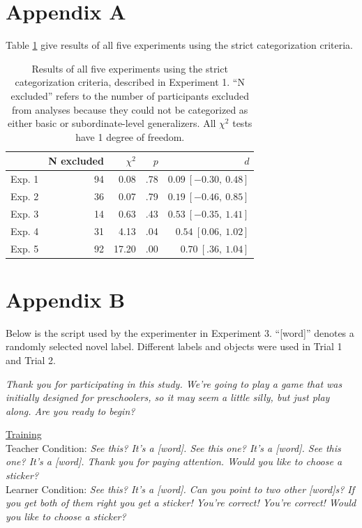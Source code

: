 \documentclass[man]{apa2}
\begin{document}
\section{Appendix A}

Table \ref{tab:strictResults} give results of all five experiments using the strict categorization criteria.

\begin{table}[h]
\centering
\begin{tabular}{rrrrr}
 \hline
 & N excluded & $\chi^2$ & $p$ & $d$ \\ 
 \hline
Exp. 1 & 94 & 0.08 & .78 & $0.09\ [-0.30,\ 0.48]$\\ 
Exp. 2 & 36 & 0.07 & .79 & $0.19\ [-0.46,\ 0.85]$ \\ 
Exp. 3 & 14 & 0.63 & .43 & $0.53\ [-0.35,\ 1.41]$ \\ 
Exp. 4 & 31 & 4.13 & .04 & $0.54\ [0.06,\ 1.02]$\\ 
Exp. 5 & 92 & 17.20 &  .00 & $0.70\ [.36,\ 1.04]$\\ 
 \hline
\end{tabular}
\caption{\label{tab:strictResults} Results of all five experiments using the strict categorization criteria, described in Experiment 1. ``N excluded'' refers to the number of participants excluded from analyses because they could not be categorized as either basic or subordinate-level generalizers. All $\chi^2$ tests have 1 degree of freedom.}
\end{table}


\section{Appendix B}
Below is the script used by the experimenter in Experiment 3. ``[word]'' denotes a randomly selected novel label. Different labels and objects were used in Trial 1 and Trial 2. 

\vspace{5mm}

{\it Thank you for participating in this study. We're going to play a game that was initially designed for preschoolers, so it may seem a little silly, but just play along. Are you ready to begin?}
\vspace{2.5mm}

\noindent \underline{Training} \\
	Teacher Condition: {\it See this? It's a [word]. See this one? It's a [word]. See this one? It's a [word]. Thank you for paying attention. Would you like to choose a sticker? }
\\
Learner Condition: {\it See this? It's a [word]. Can you point to two other [word]s? If you get both of them right you get a sticker! You're correct! You're correct! Would you like to choose a sticker? }
\vspace{2.5mm}
 
\end{document}
